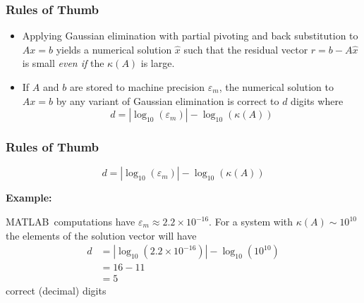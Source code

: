 \documentclass[10pt]{beamer}
\newcommand{\epsm}{\ensuremath{\varepsilon_m}}
\begin{document}
\begin{frame}
\frametitle{Rules of Thumb}

\begin{itemize}
    \item   Applying Gaussian elimination with partial pivoting and
            back substitution to $Ax=b$ yields a numerical solution
            $\hat{x}$ such that the residual vector $r=b-A\hat{x}$ is
            small \emph{even if} the $\kappa(A)$ is large.
    \item   If $A$ and $b$ are stored to machine precision $\epsm$, the
            numerical solution to $Ax=b$ by any variant of Gaussian
            elimination is correct to $d$ digits where
\begin{equation*}
                d = | \log_{10}(\epsm)| - \log_{10}\left(\kappa(A)\right)
\end{equation*}
\end{itemize}

\end{frame}
\begin{frame}
\frametitle{Rules of Thumb}

\begin{equation*}
	d = | \log_{10}(\epsm)| - \log_{10}\left(\kappa(A)\right)
\end{equation*}

\textbf{Example:}\par
MATLAB\ computations have $\epsm\approx 2.2\times10^{-16}$.  For a system
with $\kappa(A)\sim10^{10}$ the elements of the solution vector will have
\begin{align*}
    d &= | \log_{10}(2.2\times10^{-16})| - \log_{10}\left(10^{10}\right) \\
      &= 16 - 11  \\
      &= 5
\end{align*}
correct (decimal) digits

\end{frame}
\end{document}
